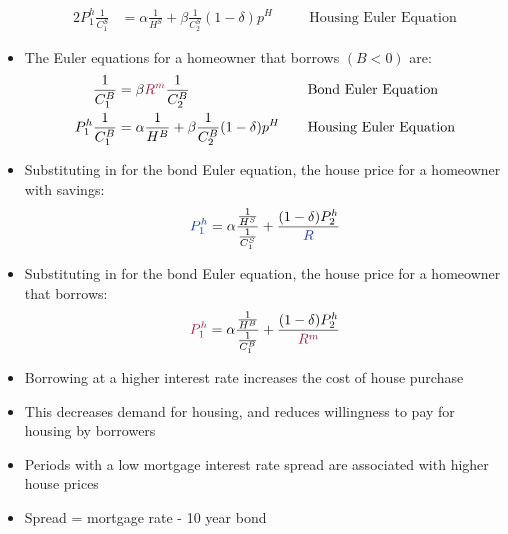 \documentclass[a4paper,twoside]{article}
\newif\IfInSansMode
\numberwithin{equation}{section}
\numberwithin{figure}{section}
\begin{document}
\begin{itemize}
\begin{alignat*}{2}
			P_1^h\frac{1}{C_1^S} &= \alpha\frac{1}{H^S}+\beta\frac{1}{C_2^S}(1-\delta)p^H\quad &&\text{Housing Euler Equation}
		\end{alignat*}
		\item The Euler equations for a homeowner that \textcolor{myred}{borrows} \( (B<0) \) are:
		\begin{alignat*}{2}
			\frac{1}{C_1^B} &= \beta\textcolor{myred}{R^m}\frac{1}{C_2^B}\quad &&\text{Bond Euler Equation}\\
			P_1^h\frac{1}{C_1^B} &= \alpha\frac{1}{H^B}+\beta\frac{1}{C_2^B}(1-\delta)p^H\quad &&\text{Housing Euler Equation}
		\end{alignat*}
		\item Substituting in for the bond Euler equation, the house price for a homeowner with \textcolor{myblue}{savings}:
		\[
			\textcolor{myblue}{P_1^h} = \alpha\frac{\frac{1}{H^S}}{\frac{1}{C_1^S}}+\frac{(1-\delta)P_2^h}{\textcolor{myblue}{R}}
		\]
		\item Substituting in for the bond Euler equation, the house price for a homeowner that \textcolor{myred}{borrows}:
		\[
			\textcolor{myred}{P_1^h} = \alpha\frac{\frac{1}{H^B}}{\frac{1}{C^B_1}} + \frac{(1-\delta)P_2^h}{\textcolor{myred}{R^m}}
		\]
		\item Borrowing at a higher interest rate increases the cost of house purchase
		\item This decreases demand for housing, and reduces willingness to pay for housing by borrowers
		\item Periods with a low mortgage interest rate \textcolor{myblue}{spread} are associated with higher house prices
		\item \textcolor{myblue}{Spread} = mortgage rate - 10 year bond
	\end{itemize}
\end{document}
